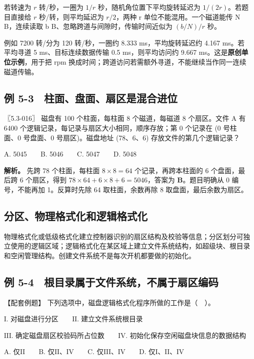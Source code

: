 若转速为 \(r\) 转/秒，一圈为 \(1/r\) 秒，随机角位置下平均旋转延迟为 \(1/(2r)\)。若题目直接给 \(r\) 秒/转，则平均延迟为 \(r/2\)，两种 r 单位不能混用。一个磁道能传 N B，连续读取 b B、忽略跨道与间隙时，传输时间近似为 \((b/N)/r\) 秒。

例如 7200 转/分为 120 转/秒，一圈约 8.333 ms，平均旋转延迟约 4.167 ms。若平均寻道 5 ms、目标连续数据传输 0.5 ms，则平均访问约 9.667 ms。这是\textbf{原创单位示例}，用于把 rpm 换成时间；跨道访问若需额外寻道，不能继续当作同一连续磁道传输。

\subsection{例 5-3　柱面、盘面、扇区是混合进位}\label{OS05-ex7-3}

\begin{example}[配套例题]

〖5.3-016〗 磁盘有 100 个柱面，每柱面 8 个磁道，每磁道 8 个扇区。文件 A 有 6400 个逻辑记录，每记录与扇区大小相同，顺序存放；第 0 个记录在 (0 号柱面、0 号盘面、0 号扇区)。磁盘地址 (78、6、6) 存放文件的第几个逻辑记录？

A. 5045　　B. 5046　　C. 5047　　D. 5048

\end{example}

\textbf{解析。} 先跨 78 个柱面，每柱面 \(8\times8=64\) 个记录，再跨本柱面的 6 个盘面，最后跨 6 个扇区，得到 \(78\times64+6\times8+6=5046\)，答案为 \textbf{B}。题目明确从 0 编号，不能再加 1。反算时先除 64 取柱面，余数再除 8 取盘面，最后余数为扇区。

\subsection{分区、物理格式化和逻辑格式化}\label{OS05-auto-2}

物理格式化或低级格式化建立控制器识别的扇区结构及校验等信息；分区划分可独立使用的逻辑区域；逻辑格式化在某区域上建立文件系统结构，如超级块、根目录和空闲管理结构。创建文件系统不是每次开机都要做的初始化。

\subsection{例 5-4　根目录属于文件系统，不属于扇区编码}\label{OS05-ex7-4}

\begin{example}[配套例题]

【配套例题】 下列选项中，磁盘逻辑格式化程序所做的工作是（　）。

\ensuremath{\mathrm{I}}. 对磁盘进行分区　　\ensuremath{\mathrm{II}}. 建立文件系统根目录

\ensuremath{\mathrm{III}}. 确定磁盘扇区校验码所占位数　　\ensuremath{\mathrm{IV}}. 初始化保存空闲磁盘块信息的数据结构

A. 仅\ensuremath{\mathrm{II}}　　B. 仅\ensuremath{\mathrm{II}}、\ensuremath{\mathrm{IV}}　　C. 仅\ensuremath{\mathrm{III}}、\ensuremath{\mathrm{IV}}　　D. 仅\ensuremath{\mathrm{I}}、\ensuremath{\mathrm{II}}、\ensuremath{\mathrm{IV}}

\end{example}

